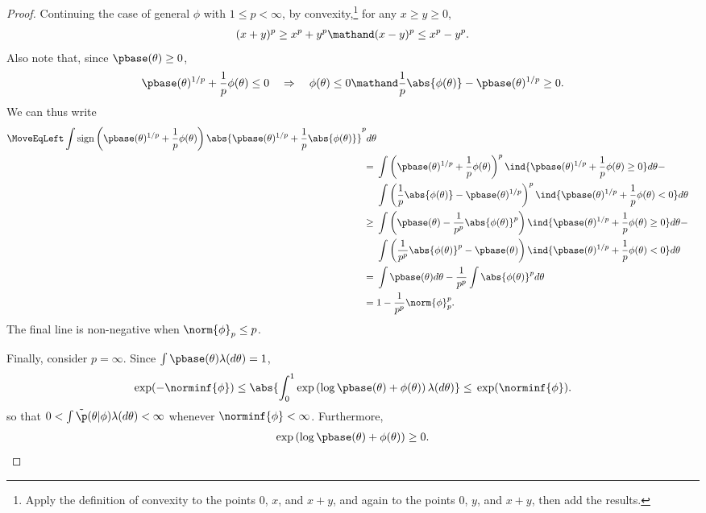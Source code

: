 \begin{proof}
Continuing the case of general $\phi$ with $1 \le p < \infty$, by
convexity,\footnote{Apply the definition of convexity to the points $0$, $x$,
and $x + y$, and again to the points $0$, $y$, and $x+y$, then add the results.}
for any $x \ge y \ge 0$,
%
\begin{align*}
%
(x + y)^p \ge{} x^p + y^p \mathand
(x - y)^p \le{} x^p - y^p.
%
\end{align*}
%
Also note that, since $\pbase(\theta) \ge 0$,
%
\begin{align*}
%
\pbase(\theta)^{1/p} + \frac{1}{p}\phi(\theta) \le 0
\quad\Rightarrow\quad
\phi(\theta) \le 0 \mathand
\frac{1}{p} \abs{\phi(\theta)} - \pbase(\theta)^{1/p} \ge 0.
%
\end{align*}
%
We can thus write
%
\begin{align*}
%
\MoveEqLeft
\int \mathrm{sign}\left(\pbase(\theta)^{1/p} + \frac{1}{p}\phi(\theta)\right)
    \abs{\pbase(\theta)^{1/p} + \frac{1}{p}\abs{\phi(\theta)}}^{p} d\theta
\\={}&
    \int \left(\pbase(\theta)^{1/p} + \frac{1}{p}\phi(\theta)\right)^{p}
        \ind{\pbase(\theta)^{1/p} + \frac{1}{p}\phi(\theta) \ge 0}
        d\theta - \\&
    \int \left(\frac{1}{p}\abs{\phi(\theta)} - \pbase(\theta)^{1/p}\right)^{p}
        \ind{\pbase(\theta)^{1/p} + \frac{1}{p}\phi(\theta) < 0}
        d\theta
\\\ge{}&
    \int \left(\pbase(\theta) - \frac{1}{p^p}\abs{\phi(\theta)}^{p}\right)
        \ind{\pbase(\theta)^{1/p} + \frac{1}{p}\phi(\theta) \ge 0}
        d\theta - \\&
    \int \left(\frac{1}{p^p}\abs{\phi(\theta)}^p - \pbase(\theta)\right)
        \ind{\pbase(\theta)^{1/p} + \frac{1}{p}\phi(\theta) < 0}
        d\theta
\\={}&
    \int \pbase(\theta) d\theta - \frac{1}{p^p}\int \abs{\phi(\theta)}^p d\theta
\\={}&
    1 - \frac{1}{p^p} \norm{\phi}_p^p.
%
\end{align*}
%
The final line is non-negative when $\norm{\phi}_p \le p$.





Finally, consider $p = \infty$.  Since $\int \pbase(\theta) \lambda(d\theta) = 1$,
%
\begin{align*}
%
\exp(-\norminf{\phi}) \le{}
\abs{\int_0^1 \exp\left(\log \pbase(\theta) + \phi(\theta)\right) \lambda(d\theta)}
\le{}
\exp(\norminf{\phi}).
%
\end{align*}
%
so that $0 < \int \tilde{\p}(\theta \vert \phi) \lambda(d\theta) < \infty$
whenever $\norminf{\phi} < \infty$.  Furthermore,
%
\begin{align*}
%
\exp\left(\log \pbase(\theta) + \phi(\theta)\right) \ge 0.
%
\end{align*}
%
\end{proof}







